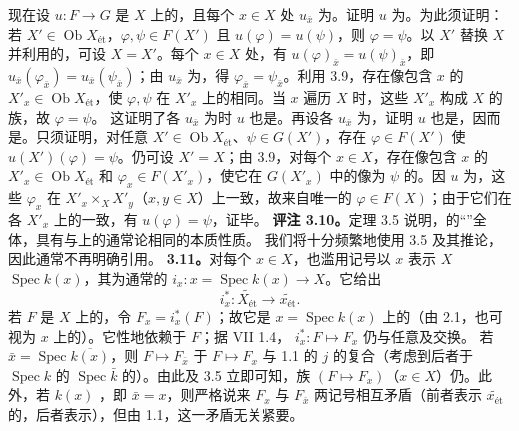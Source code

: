 现在设 $u:F\to G$ 是 $X$ 上的，且每个 $x\in X$ 处 $u_{\bar x}$ 为。证明 $u$ 为。为此须证明：若 $X'\in\operatorname{Ob}X_{\text{ét}}$，$\varphi,\psi\in F(X')$ 且 $u(\varphi)=u(\psi)$，则 $\varphi=\psi$。以 $X'$ 替换 $X$ 并利用的，可设 $X=X'$。每个 $x\in X$ 处，有 $u(\varphi)_{\bar x}=u(\psi)_{\bar x}$，即 $u_{\bar x}(\varphi_{\bar x})=u_{\bar x}(\psi_{\bar x})$；由 $u_{\bar x}$ 为，得 $\varphi_{\bar x}=\psi_{\bar x}$。利用 3.9，存在像包含 $x$ 的 $X'_x\in\operatorname{Ob}X_{\text{ét}}$，使 $\varphi,\psi$ 在 $X'_x$ 上的相同。当 $x$ 遍历 $X$ 时，这些 $X'_x$ 构成 $X$ 的族，故 $\varphi=\psi$。
这证明了各 $u_{\bar x}$ 为时 $u$ 也是。再设各 $u_{\bar x}$ 为，证明 $u$ 也是，因而是。只须证明，对任意 $X'\in\operatorname{Ob}X_{\text{ét}}$、$\psi\in G(X')$，存在 $\varphi\in F(X')$ 使 $u(X')(\varphi)=\psi$。仍可设 $X'=X$；由 3.9，对每个 $x\in X$，存在像包含 $x$ 的 $X'_x\in\operatorname{Ob}X_{\text{ét}}$ 和 $\varphi_x\in F(X'_x)$，使它在 $G(X'_x)$ 中的像为 $\psi$ 的。因 $u$ 为，这些 $\varphi_x$ 在 $X'_x\times_X X'_y$（$x,y\in X$）上一致，故来自唯一的 $\varphi\in F(X)$；由于它们在各 $X'_x$ 上的一致，有 $u(\varphi)=\psi$，证毕。
\textbf{评注 3.10。}定理 3.5 说明，的“”全体，具有与上的通常论相同的本质性质。
我们将十分频繁地使用 3.5 及其推论，因此通常不再明确引用。
\textbf{3.11。}对每个 $x\in X$，也滥用记号以 $x$ 表示 $X$  $\operatorname{Spec}k(x)$，其为通常的 $i_x:x=\operatorname{Spec}k(x)\to X$。它给出
\[i_x^*:\widetilde{X_{\text{ét}}}\longrightarrow\widetilde{x_{\text{ét}}}.\]
若 $F$ 是 $X$ 上的，令 $F_x=i_x^*(F)$；故它是 $x=\operatorname{Spec}k(x)$ 上的（由 2.1，也可视为 $x$ 上的）。它性地依赖于 $F$；据 VII 1.4， $i_x^*:F\mapsto F_x$ 仍与任意及交换。
若 $\bar x=\operatorname{Spec}\overline{k(x)}$，则 $F\mapsto F_{\bar x}$ 于 $F\mapsto F_x$ 与 1.1 的 $j$ 的复合（考虑到后者于 $\operatorname{Spec}k$ 的 $\operatorname{Spec}\bar k$ 的）。由此及 3.5 立即可知，族 $(F\mapsto F_x)$（$x\in X$）仍。此外，若 $k(x)$ ，即 $\bar x=x$，则严格说来 $F_x$ 与 $F_{\bar x}$ 两记号相互矛盾（前者表示 $\widetilde{x_{\text{ét}}}$ 的，后者表示），但由 1.1，这一矛盾无关紧要。
